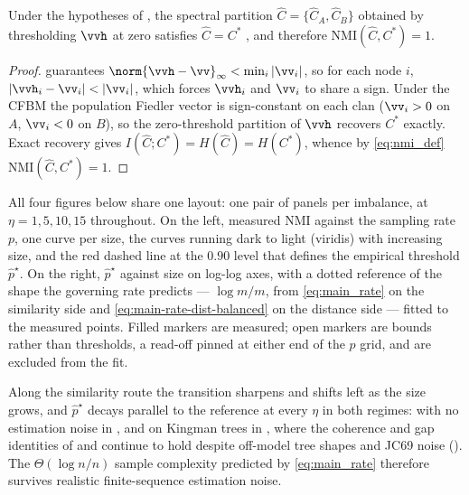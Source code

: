 \begin{corollary}[Perfect partition recovery and $\mathrm{NMI}=1$]\label{cor:nmi}
Under the hypotheses of , the spectral partition $\hat C=\{\hat C_A,\hat C_B\}$ obtained by thresholding $\vvh$ at zero satisfies $\hat C=C^\ast$ \hp, and therefore $\mathrm{NMI}(\hat C,C^\ast)=1$.
\end{corollary}
\begin{proof}
 guarantees $\norm{\vvh-\vv}_\infty<\min_i|\vv_i|$, so for each node $i$, $|\vvh_i-\vv_i|<|\vv_i|$, which forces $\vvh_i$ and $\vv_i$ to share a sign. Under the CFBM the population Fiedler vector is sign-constant on each clan \cite{aizenbud2023spectral} ($\vv_i>0$ on $A$, $\vv_i<0$ on $B$), so the zero-threshold partition of $\vvh$ recovers $C^\ast$ exactly. Exact recovery gives $I(\hat C;C^\ast)=H(\hat C)=H(C^\ast)$, whence by \eqref{eq:nmi_def} $\mathrm{NMI}(\hat C,C^\ast)=1$.
\end{proof}

All four figures below share one layout: one pair of panels per imbalance, at $\eta=1,5,10,15$ throughout. On the left, measured NMI against the sampling rate $p$, one curve per size, the curves running dark to light (viridis) with increasing size, and the red dashed line at the $0.90$ level that defines the empirical threshold $\hat p^\star$. On the right, $\hat p^\star$ against size on log-log axes, with a dotted reference of the shape the governing rate predicts --- $\log m/m$, from \eqref{eq:main_rate} on the similarity side and \eqref{eq:main-rate-dist-balanced} on the distance side --- fitted to the measured points. Filled markers are measured; open markers are bounds rather than thresholds, a read-off pinned at either end of the $p$ grid, and are excluded from the fit.

Along the similarity route the transition sharpens and shifts left as the size grows, and $\hat p^\star$ decays parallel to the reference at every $\eta$ in both regimes: with no estimation noise in , and on Kingman trees in , where the coherence and gap identities of  and  continue to hold despite off-model tree shapes and JC69 noise (). The $\Theta(\log n/n)$ sample complexity predicted by \eqref{eq:main_rate} therefore survives realistic finite-sequence estimation noise.


